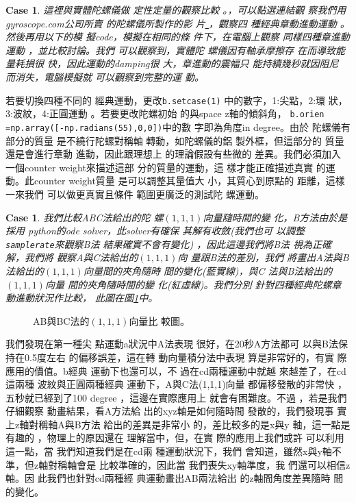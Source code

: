 \documentclass[12pt,twoside]{article}
\newtheorem{case}[theorem]{Case}
\begin{document}
\begin{case}
這裡與實體陀螺儀做%
定性定量的觀察比較%
。，可以點選連結觀%
察我們用gyroscope.com公司所賣%
的陀螺儀所製作的影%
片\href{http://tinypic.com/r/2clcee/8}{\underline{\color{blue}%
}}，觀察四%
種經典章動進動運動%
。然後再用以下的模%
擬code，模擬在相同的條%
件下，在電腦上觀察%
同樣四種章進動運動%
，並比較討論。我們%
可以觀察到，實體陀%
螺儀因有軸承摩擦存%
在而導致能量耗損很%
快，因此運動的damping很%
大，章進動的震幅只%
能持續幾秒就因阻尼%
而消失，電腦模擬就%
可以觀察到完整的運%
動。%
%
\end{case}

若要切換四種不同的%
經典運動，更改\texttt{b.setcase(1)}%
中的數字，1:尖點，2:環%
狀，3:波紋，4:正圓運動%
。若要更改陀螺初始%
的與space z軸的傾斜角，%
\texttt{b.orien =np.array([-np.radians(55),0,0])}中的數%
字即為角度in degree。由於%
陀螺儀有部分的質量%
是不繞行陀螺對稱軸%
轉動，如陀螺儀的鋁%
製外框，但這部分的%
質量還是會進行章動%
進動，因此跟理想上%
的理論假設有些微的%
差異。我們必須加入%
一個counter weight來描述這部%
分的質量的運動，這%
樣才能正確描述真實%
的運動。此counter weight質量%
是可以調整其量值大%
小，其質心到原點的%
距離，這樣一來我們%
可以做更真實且條件%
範圍更廣泛的測試陀%
螺運動。

\begin{case}
我們比較ABC法給出的陀%
螺$(1,1,1)$向量隨時間的變%
化，B方法由於是採用%
python的ode solver，此solver有確保%
其解有收斂(我們也可%
以調整\texttt{samplerate}來觀察B法%
結果確實不會有變化)%
，因此這邊我們將B法%
視為正確解，我們將%
觀察A與C法給出的$(1,1,1)$向%
量跟B法的差別，我們%
將畫出A法與B法給出的$%
(1,1,1)$向量間的夾角隨時%
間的變化(藍實線)，與C%
法與B法給出的$(1,1,1)$向量%
間的夾角隨時間的變%
化(紅虛線)。我們分別%
針對四種經典陀螺章%
動進動狀況作比較，%
此圖在圖\ref{ABCcompareFig}中。
\end{case}

\begin{figure}[th]
\caption{AB與BC法的$(1,1,1)$向量比%
較圖。}
\label{ABCcompareFig}
\begin{center}

\end{center}
\end{figure}

我們發現在第一種尖%
點運動a狀況中A法表現%
很好，在20秒A方法都可%
以與B法保持在0.5度左右%
的偏移誤差，這在轉%
動向量積分法中表現%
算是非常好的，有實%
際應用的價值。b經典%
運動下也還可以，不%
過在cd兩種運動中就越%
來越差了，在cd這兩種%
波紋與正圓兩種經典%
運動下，A與C法(1,1,1)向量%
都偏移發散的非常快%
，五秒就已經到了100 degree%
，這邊在實際應用上%
就會有困難度。不過%
，若是我們仔細觀察%
動畫結果，看A方法給%
出的xyz軸是如何隨時間%
發散的，我們發現事%
實上z軸對稱軸A與B方法%
給出的差異是非常小%
的，差比較多的是x與y%
軸，這一點是有趣的%
，物理上的原因還在%
理解當中，但，在實%
際的應用上我們或許%
可以利用這一點，當%
我們知道我們是在cd兩%
種運動狀況下，我們%
會知道，雖然x與y軸不%
準，但z軸對稱軸會是%
比較準確的，因此當%
我們喪失xy軸準度，我%
們還可以相信z軸。因%
此我們也針對cd兩種經%
典運動畫出AB兩法給出%
的z軸間角度差異隨時%
間的變化。
\end{document}

